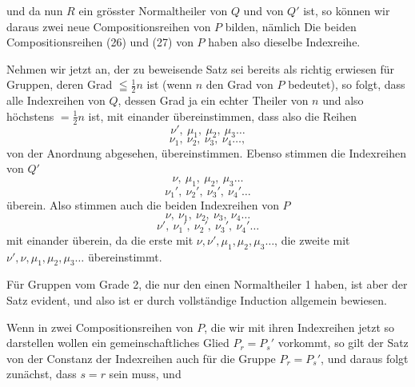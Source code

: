 und da nun $R$ ein grösster Normaltheiler von $Q$ und von $Q'$ ist,
so können wir daraus zwei neue Compositionsreihen von $P$ bilden,
nämlich
Die beiden Compositionsreihen (26) und (27) von $P$ haben also
dieselbe Indexreihe.

Nehmen wir jetzt an, der zu beweisende Satz sei bereits als richtig
erwiesen für Gruppen, deren Grad $\leqq \frac{1}{2}n$ ist (wenn $n$
den Grad von $P$ bedeutet), so folgt, dass alle Indexreihen von
$Q$, dessen Grad ja ein echter Theiler von $n$ und also höchstens
$= \frac{1}{2}n$ ist, mit einander übereinstimmen, dass also die
Reihen
\[
\nu',\ \mu_1,\ \mu_2,\ \mu_3 \ldots
\]
\[
\nu_1,\ \nu_2,\ \nu_3,\ \nu_4 \ldots,
\]
von der Anordnung abgesehen, übereinstimmen. Ebenso stimmen die
Indexreihen von $Q'$
\[
\nu,\ \mu_1,\ \mu_2,\ \mu_3 \ldots
\]
\[
\nu_1',\ \nu_2',\ \nu_3',\ \nu_4' \ldots
\]
überein. Also stimmen auch die beiden Indexreihen von $P$
\[
\nu,\ \nu_1,\ \nu_2,\ \nu_3,\ \nu_4 \ldots
\]
\[
\nu',\ \nu_1',\ \nu_2',\ \nu_3',\ \nu_4' \ldots
\]
mit einander überein, da die erste mit $\nu, \nu', \mu_1, \mu_2, \mu_3
\ldots$, die zweite mit $\nu', \nu, \mu_1, \mu_2, \mu_3 \ldots$
übereinstimmt.

Für Gruppen vom Grade 2, die nur den einen Normaltheiler 1 haben,
ist aber der Satz evident, und also ist er durch vollständige
Induction allgemein bewiesen.

Wenn in zwei Compositionsreihen von $P$, die wir mit ihren
Indexreihen jetzt so darstellen wollen
ein gemeinschaftliches Glied $P_r = P_s'$ vorkommt, so gilt der
Satz von der Constanz der Indexreihen auch für die Gruppe $P_r =
P_s'$, und daraus folgt zunächst, dass $s = r$ sein muss, und
